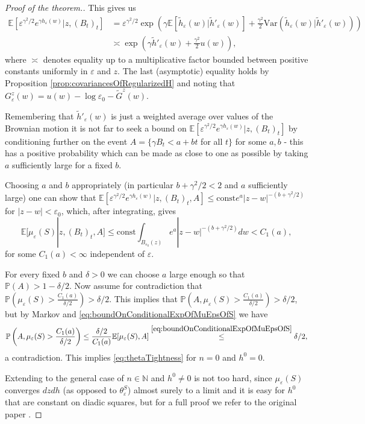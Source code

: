 \documentclass[11pt,reqno]{amsart}
\numberwithin{equation}{section}
\newcommand{\leqby}[1]{\mathrel{\stackrel{#1}{\leq}}}
\newcommand{\eps}{\varepsilon}
\begin{document}
\begin{proof}[Proof of the theorem.]
	This gives us \begin{align*}
		\mathbb E\left[\eps^{\gamma^2/2}e^{\gamma h_\eps(w)}|z,(B_t)_t\right] &= \eps^{\gamma^2/2}\exp\left(\gamma\mathbb E[\tilde h_\eps(w)|\tilde h'_\eps(w)]+\frac{\gamma^2}{2}\text{Var}(\tilde h_\eps(w)|\tilde h'_\eps(w))\right)\\
		&\asymp\exp\left(\gamma \tilde h'_\eps(w) + \frac{\gamma^2}{2}u(w)\right),
	\end{align*}
	where $\asymp$ denotes equality up to a multiplicative factor bounded between positive constants uniformly in $\eps$ and $z$. The last (asymptotic) equality holds by Proposition \ref{prop:covariancesOfRegularizedH} and noting that $G_\eps^z(w)=u(w)-\log\eps_0-\tilde G^z(w)$.
	
	Remembering that $\tilde h'_\eps(w)$ is just a weighted average over values of the Brownian motion it is not far to seek a bound on $\mathbb E\left[\eps^{\gamma^2/2}e^{\gamma h_\eps(w)}|z,(B_t)_t\right]$ by conditioning further on the event $A=\{\gamma B_t<a+bt$ for all $t\}$ for some $a,b$ - this has a positive probability which can be made as close to one as possible by taking $a$ sufficiently large for a fixed $b$.
	
	Choosing $a$ and $b$ appropriately (in particular $b+\gamma^2/2<2$ and $a$ sufficiently large) one can show that $\mathbb E\left[\eps^{\gamma^2/2}e^{\gamma h_\eps(w)}|z,(B_t)_t,A\right]\leq \text{const} e^a|z-w|^{-(b+\gamma^2/2)}$ for $|z-w|<\eps_0$, which, after integrating, gives \begin{equation}\label{eq:boundOnConditionalExpOfMuEpsOfS}
			\mathbb E[\mu_\eps(S)|z,(B_t)_t,A]\leq \text{const}\int_{B_{\eps_0}(z)}e^a|z-w|^{-(b+\gamma^2/2)}dw<C_1(a),
		\end{equation} for some $C_1(a)<\infty$ independent of $\eps$.
	
	For every fixed $b$ and $\delta>0$ we can choose $a$ large enough so that $\mathbb P(A)>1-\delta/2$. Now assume for contradiction that $\mathbb P(\mu_\eps(S)>\frac{C_1(a)}{\delta/2})>\delta/2$. This implies that $\mathbb P(A,\mu_\eps(S)>\frac{C_1(a)}{\delta/2})>\delta/2$, but by Markov and \eqref{eq:boundOnConditionalExpOfMuEpsOfS} we have $$\mathbb P\left(A,\mu_\eps(S)>\frac{C_1(a)}{\delta/2}\right)\leq \frac{\delta/2}{C_1(a)} \mathbb E[\mu_\eps(S),A]\leqby{\eqref{eq:boundOnConditionalExpOfMuEpsOfS}} \delta/2,$$ a contradiction. This implies \eqref{eq:thetaTightness} for $n=0$ and $h^0=0$.
	
	Extending to the general case of $n\in\mathbb N$ and $h^0\neq 0$ is not too hard, since $\mu_\eps(S)$ converges $dzdh$ (as opposed to $\theta_\eps^S$) almost surely to a limit and it is easy for $h^0$ that are constant on diadic squares, but for a full proof we refer to the original paper \cite{Dup10}.
	\end{proof}
\end{document}
